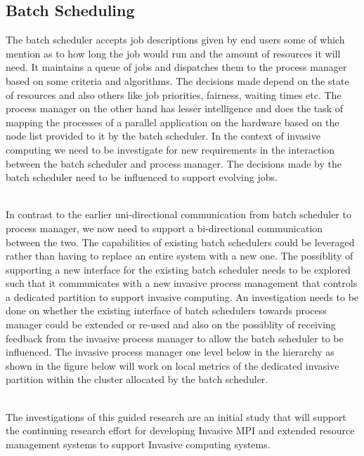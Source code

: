 \documentclass[a4paper, 12pt]{article}
\begin{document}
\subsection{Batch Scheduling}
The batch scheduler accepts job descriptions given by end users some of which mention as to how long the job would run and the amount of resources it will need. It maintains a queue of jobs and dispatches them to the process manager based on some criteria and algorithms. The decisions made depend on the state of resources and also others like job priorities, fairness, waiting times etc. The process manager on the other hand has lesser intelligence and does the task of mapping the processes of a parallel application on the hardware based on the node list provided to it by the batch scheduler. In the context of invasive computing we need to be investigate for new requirements in the interaction between the batch scheduler and process manager. The decisions made by the batch scheduler need to be influenced to support evolving jobs.\par
\noindent
\\In contrast to the earlier uni-directional communication from batch scheduler to process manager, we now need to support a bi-directional communication between the two. The capabilities of existing batch schedulers could be leveraged rather than having to replace an entire system with a new one. The possiblity of supporting a new interface for the existing batch scheduler needs to be explored such that it communicates with a new invasive process management that controls a dedicated partition to support invasive computing. An investigation needs to be done on whether the existing interface of batch schedulers towards process manager could be extended or re-used and also on the possiblity of receiving feedback from the invasive process manager to allow the batch scheduler to be influenced. The invasive process manager one level below in the hierarchy as shown in the figure below will work on local metrics of the dedicated invasive partition within the cluster allocated by the batch scheduler.\par
\noindent
\\The investigations of this guided research are an initial study that will support the continuing research effort for developing Invasive MPI and extended resource management systems to support Invasive computing systems.
\end{document}
